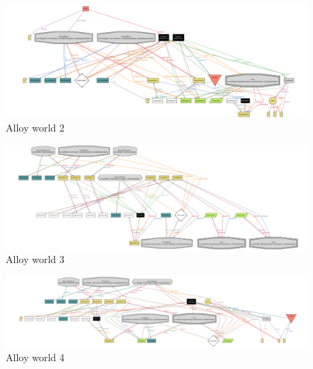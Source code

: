\documentclass{article}
\begin{document}
\begin{figure}[H]
    \centering
    \includegraphics[angle=90,scale=0.25]{Images/Alloy-World2}
    \caption{Alloy world 2}
\end{figure}
\begin{figure}[H]
    \centering
    \includegraphics[angle=90,scale=0.23]{Images/Alloy-World3}
    \caption{Alloy world 3}
\end{figure}
\begin{figure}[H]
    \centering
    \includegraphics[angle=90, scale=0.22]{Images/Alloy-World4}
    \caption{Alloy world 4}
\end{figure}
\end{document}
